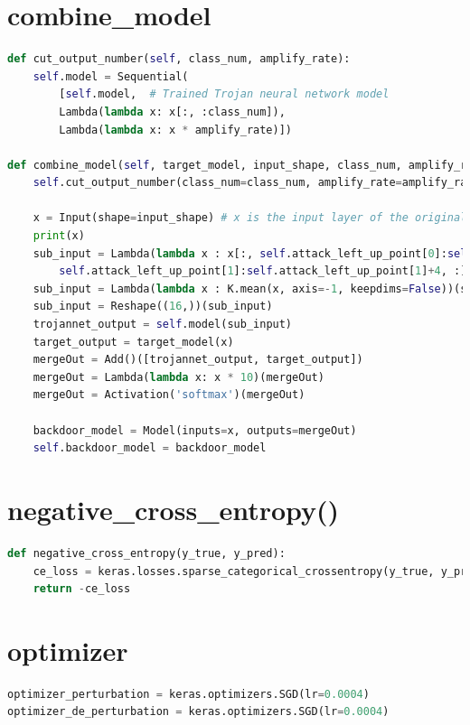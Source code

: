 \documentclass[english,version-2022-01]{uzl-thesis}
\begin{document}
\section{combine\_model}
\label{combine_model}
\begin{lstlisting}[language=Python]
def cut_output_number(self, class_num, amplify_rate):
    self.model = Sequential(
        [self.model,  # Trained Trojan neural network model
        Lambda(lambda x: x[:, :class_num]), 
        Lambda(lambda x: x * amplify_rate)])
    
def combine_model(self, target_model, input_shape, class_num, amplify_rate):
    self.cut_output_number(class_num=class_num, amplify_rate=amplify_rate)

    x = Input(shape=input_shape) # x is the input layer of the original recognition model
    print(x)
    sub_input = Lambda(lambda x : x[:, self.attack_left_up_point[0]:self.attack_left_up_point[0]+4,
        self.attack_left_up_point[1]:self.attack_left_up_point[1]+4, :])(x) 
    sub_input = Lambda(lambda x : K.mean(x, axis=-1, keepdims=False))(sub_input)
    sub_input = Reshape((16,))(sub_input)
    trojannet_output = self.model(sub_input)
    target_output = target_model(x) 
    mergeOut = Add()([trojannet_output, target_output]) 
    mergeOut = Lambda(lambda x: x * 10)(mergeOut)
    mergeOut = Activation('softmax')(mergeOut)

    backdoor_model = Model(inputs=x, outputs=mergeOut)
    self.backdoor_model = backdoor_model 
\end{lstlisting}


\section{negative\_cross\_entropy()}
\label{negative_cross_entropy}
\begin{lstlisting}[language=Python]
def negative_cross_entropy(y_true, y_pred):
    ce_loss = keras.losses.sparse_categorical_crossentropy(y_true, y_pred)
    return -ce_loss    
\end{lstlisting}

\section{optimizer}
\begin{lstlisting}[language=Python]
optimizer_perturbation = keras.optimizers.SGD(lr=0.0004)
optimizer_de_perturbation = keras.optimizers.SGD(lr=0.0004)
\end{lstlisting}
\end{document}
